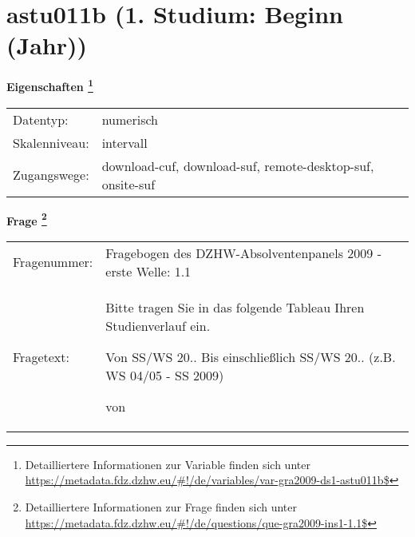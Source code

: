 
    \setcounter{footnote}{0}

    \vspace*{-1.8cm}
	\section{astu011b (1. Studium: Beginn (Jahr))}
	\label{section:astu011b}



    \vspace*{0.5cm}
    \noindent\textbf{Eigenschaften
	\footnote{Detailliertere Informationen zur Variable finden sich unter
		\url{https://metadata.fdz.dzhw.eu/\#!/de/variables/var-gra2009-ds1-astu011b$}}}\\
	\begin{tabularx}{\hsize}{@{}lX}
	Datentyp: & numerisch \\
	Skalenniveau: & intervall \\
	Zugangswege: &
	  download-cuf, 
	  download-suf, 
	  remote-desktop-suf, 
	  onsite-suf
 \\
    \end{tabularx}



				\vspace*{0.5cm}
                \noindent\textbf{Frage
	                \footnote{Detailliertere Informationen zur Frage finden sich unter
		              \url{https://metadata.fdz.dzhw.eu/\#!/de/questions/que-gra2009-ins1-1.1$}}}\\
				\begin{tabularx}{\hsize}{@{}lX}
					Fragenummer: &
					  Fragebogen des DZHW-Absolventenpanels 2009 - erste Welle:
					  1.1
 \\
					Fragetext: & Bitte tragen Sie in das folgende Tableau Ihren Studienverlauf ein.\par  Von SS/WS 20.. Bis einschließlich SS/WS 20.. (z.B. WS 04/05 - SS 2009)\par  von \\
				\end{tabularx}





